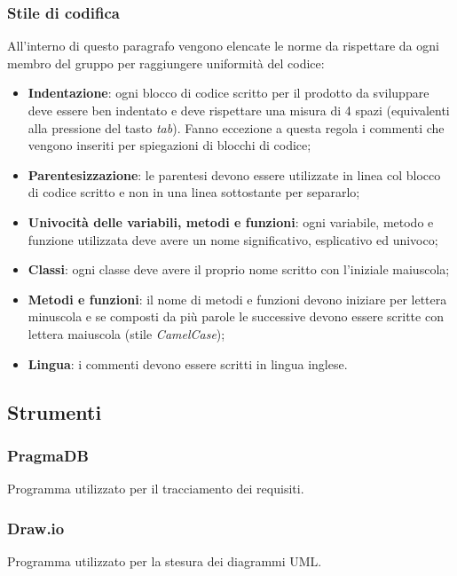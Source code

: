 \subsubsection{Stile di codifica}\label{2.2.5.4}
All'interno di questo paragrafo vengono elencate le norme da rispettare da ogni membro del gruppo per raggiungere uniformità del codice:

\begin{itemize}
	\item \textbf{Indentazione}: ogni blocco di codice scritto per il prodotto da sviluppare deve essere ben indentato e deve rispettare una misura di 4 spazi (equivalenti alla pressione del tasto \textit{tab}). Fanno eccezione a questa regola i commenti che vengono inseriti per spiegazioni di blocchi di codice;
	\item \textbf{Parentesizzazione}: le parentesi devono essere utilizzate in linea col blocco di codice scritto e non in una linea sottostante per separarlo;
	\item \textbf{Univocità delle variabili, metodi e funzioni}: ogni variabile, metodo e funzione utilizzata deve avere un nome significativo, esplicativo ed univoco;
	\item \textbf{Classi}: ogni classe deve avere il proprio nome scritto con l'iniziale maiuscola;
	\item \textbf{Metodi e funzioni}: il nome di metodi e funzioni devono iniziare per lettera minuscola e se composti da più parole le successive devono essere scritte con lettera maiuscola (stile \textit{CamelCase});
	\item \textbf{Lingua}: i commenti devono essere scritti in lingua inglese.
\end{itemize}

\subsection{Strumenti}\label{2.2.6}

\subsubsection{PragmaDB}
Programma utilizzato per il tracciamento dei requisiti.
\subsubsection{Draw.io}
Programma utilizzato per la stesura dei diagrammi UML.